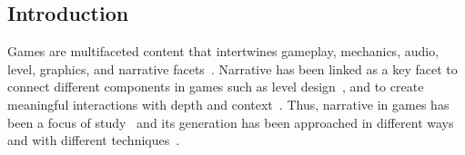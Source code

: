 \subsection{Introduction}






Games are multifaceted content that intertwines gameplay, mechanics, audio, level, graphics, and narrative facets~\cite{p11liapis_orchestrating_2019}. Narrative has been linked as a key facet to connect different components in games such as level design~\cite{p11kishino_hunt_2005}, and to create meaningful interactions with depth and context~\cite{p11ashmore_quest_2007,kybartas_quinn_survey_2017}. Thus, narrative in games has been a focus of study~\cite{p11aarseth_narrative_2012,eladhari_interweaving_2014,yu_what_2020} and its generation has been approached in different ways and with different techniques~\cite{p11smith_situating_2011,ammanabrolu_story_2020,green_data_2018,tambwekar_controllable_2019,alvarez_questgram_2021}.

